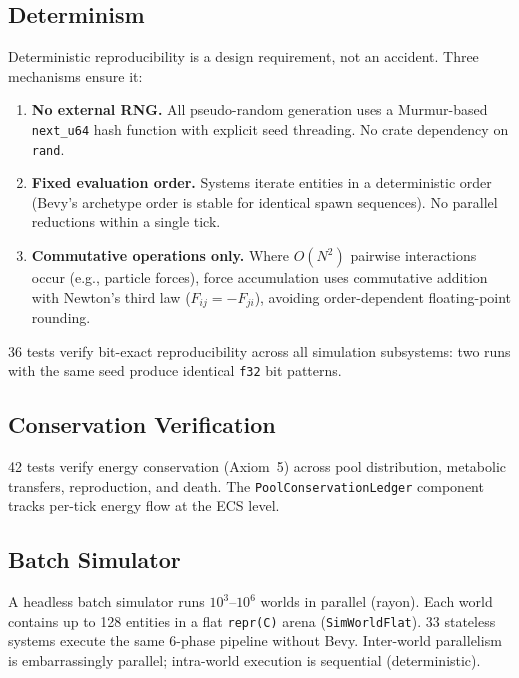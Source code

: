 \documentclass[11pt,a4paper]{article}
\begin{document}
\subsection{Determinism}
\label{sec:determinism}

Deterministic reproducibility is a design requirement, not
an accident. Three mechanisms ensure it:

\begin{enumerate}
  \item \textbf{No external RNG.} All pseudo-random generation
        uses a Murmur-based \texttt{next\_u64} hash function
        with explicit seed threading. No crate dependency on
        \texttt{rand}.
  \item \textbf{Fixed evaluation order.} Systems iterate entities
        in a deterministic order (Bevy's archetype order is
        stable for identical spawn sequences). No parallel
        reductions within a single tick.
  \item \textbf{Commutative operations only.} Where $O(N^2)$
        pairwise interactions occur (e.g., particle forces),
        force accumulation uses commutative addition with
        Newton's third law ($F_{ij} = -F_{ji}$), avoiding
        order-dependent floating-point rounding.
\end{enumerate}

36 tests verify bit-exact reproducibility across all
simulation subsystems: two runs with the same seed produce
identical \texttt{f32} bit patterns.

\subsection{Conservation Verification}

42 tests verify energy conservation (Axiom~5) across
pool distribution, metabolic transfers, reproduction,
and death. The \texttt{PoolConservationLedger} component
tracks per-tick energy flow at the ECS level.

\subsection{Batch Simulator}

A headless batch simulator runs $10^3$--$10^6$ worlds
in parallel (rayon). Each world contains up to 128 entities
in a flat \texttt{repr(C)} arena (\texttt{SimWorldFlat}).
33 stateless systems execute the same 6-phase pipeline
without Bevy. Inter-world parallelism is embarrassingly
parallel; intra-world execution is sequential (deterministic).
\end{document}
